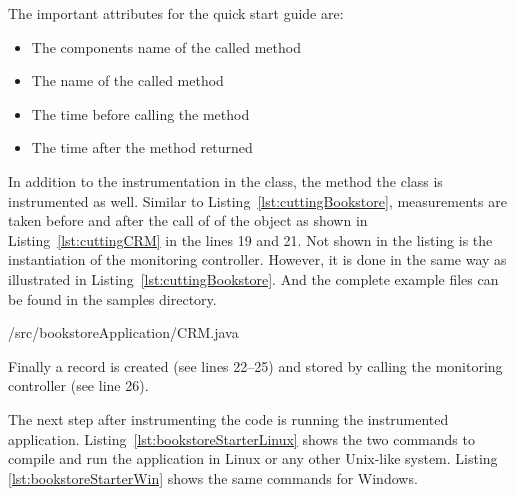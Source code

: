 \noindent The important attributes for the quick start guide are:

\begin{itemize}
\item[\hskip1em\class{componentName:}] The components name of the called method
\item[\hskip1em\class{opName:}] The name of the called method
\item[\hskip1em\class{tin:}] The time before calling the method
\item[\hskip1em\class{tout:}] The time after the method returned
\end{itemize}

\noindent In addition to the instrumentation in the  class, the  method the  class is instrumented as well. Similar to Listing~\ref{lst:cuttingBookstore}, measurements are taken before and after the call of  of the  object as shown in Listing~\ref{lst:cuttingCRM} in the lines 19 and 21. Not shown in the listing is the instantiation of the monitoring controller. However, it is done in the same way as illustrated in Listing~\ref{lst:cuttingBookstore}. And the complete example files can be found in the samples directory.

\setJavaCodeListing
%
{\manualInstrumentedBookstoreApplicationDir/src/bookstoreApplication/CRM.java}

\noindent Finally a record is created (see lines 22--25) and stored by calling the monitoring controller (see line 26).

The next step after instrumenting the code is running the instrumented application. Listing~\ref{lst:bookstoreStarterLinux} shows the two commands to compile and run the application in Linux or any other Unix-like system. Listing \ref{lst:bookstoreStarterWin} shows the same commands for Windows.

\setBashListing 		
	




